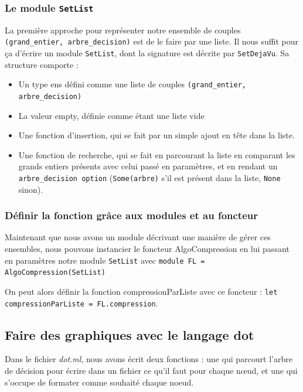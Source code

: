 \documentclass[12pt,a4paper]{article}
\begin{document}
\subsubsection{Le module \texttt{SetList}}

La première approche pour représenter notre ensemble de couples \texttt{(grand\_entier, arbre\_decision)} est de le faire par une liste. Il nous suffit pour ça d'écrire un module \texttt{SetList}, dont la signature est décrite par \texttt{SetDejaVu}. Sa structure  comporte : 


\begin{itemize}
\item Un type ens défini comme une liste de couples \texttt{(grand\_entier, arbre\_decision)}
\item La valeur empty, définie comme étant une liste vide
\item Une fonction d'insertion, qui se fait par un simple ajout en tête dans la liste.
\item Une fonction de recherche, qui se fait en parcourant la liste en comparant les grands entiers présents avec celui passé en paramètres, et en rendant un \texttt{arbre\_decision option} (\texttt{Some(arbre)} s'il est présent dans la liste, \texttt{None} sinon).

\end{itemize}

\subsubsection{Définir la fonction grâce aux modules et au foncteur}

Maintenant que nous avons un module décrivant une manière de gérer ces ensembles, nous pouvons instancier le foncteur AlgoCompression en lui passant en paramètres notre module \texttt{SetList} avec \texttt{module FL = AlgoCompression(SetList)}

On peut alors définir la fonction compressionParListe avec ce foncteur : \texttt{let compressionParListe = FL.compression}.


\subsection{Faire des graphiques avec le langage dot}

Dans le fichier \textit{dot.ml}, nous avons écrit deux fonctions : une qui parcourt l'arbre de décision pour écrire dans un fichier ce qu'il faut pour chaque nœud, et une qui s'occupe de formater comme souhaité chaque noeud.
\end{document}
